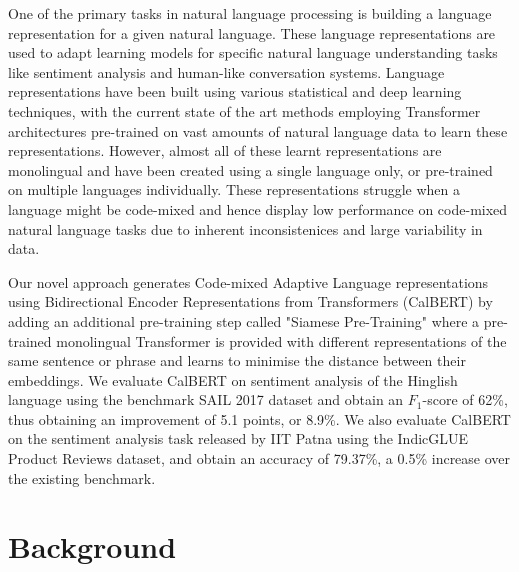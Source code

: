 \documentclass[conference]{IEEEtran}
\begin{document}
One of the primary tasks in natural language processing is building a language representation for a given natural language. These language representations are used to adapt learning models for specific natural language understanding tasks like sentiment analysis and human-like conversation systems. Language representations have been built using various statistical and deep learning techniques, with the current state of the art methods employing Transformer architectures pre-trained on vast amounts of natural language data to learn these representations. However, almost all of these learnt representations are monolingual and have been created using a single language only, or pre-trained on multiple languages individually. These representations struggle when a language might be code-mixed and hence display low performance on code-mixed natural language tasks due to inherent inconsistenices and large variability in data.

Our novel approach generates Code-mixed Adaptive Language representations using Bidirectional Encoder Representations from Transformers (CalBERT) by adding an additional pre-training step called "Siamese Pre-Training" where a pre-trained monolingual Transformer\cite{b2} is provided with different representations of the same sentence or phrase and learns to minimise the distance between their embeddings. We evaluate CalBERT on sentiment analysis\cite{b4} of the Hinglish language using the benchmark SAIL 2017 dataset\cite{b5} and obtain an $F_1$-score of 62\%, thus obtaining an improvement of 5.1 points, or 8.9\%. We also evaluate CalBERT on the sentiment analysis task released by IIT Patna using the IndicGLUE Product Reviews dataset\cite{b17}, and obtain an accuracy of 79.37\%,  a 0.5\% increase over the existing benchmark. 

\section{Background}
\end{document}
